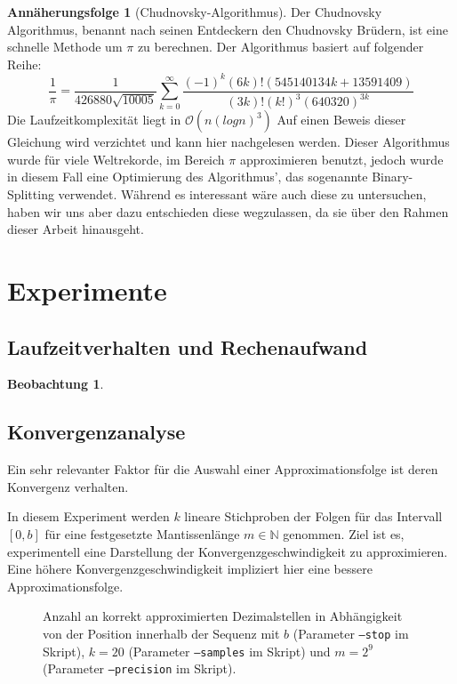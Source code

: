 \documentclass{scrartcl}
\theoremstyle{definition}
\newtheorem{approximation sequence}{Annäherungsfolge}
\newtheorem{observation}{Beobachtung}
\begin{document}
\begin{approximation sequence}[Chudnovsky-Algorithmus]
Der Chudnovsky Algorithmus, benannt nach seinen Entdeckern den Chudnovsky Brüdern, ist eine schnelle Methode um \(\pi\) zu berechnen. 
Der Algorithmus basiert auf folgender Reihe\cite{Chudnovsky}:
\[\frac{1}{\pi} = \frac{1}{426880\sqrt{10005}}\sum_{k = 0}^{\infty}\frac{(-1)^k(6k)!(545140134k+13591409)}{(3k)!(k!)^3(640320)^{3k}}\]
Die Laufzeitkomplexität liegt in \(\mathcal{O}(n(logn)^3)\) \cite{Runtime-Chudnovsky} 
Auf einen Beweis dieser Gleichung wird verzichtet und kann hier \cite{Chudnovsky-Proof} nachgelesen werden.
Dieser Algorithmus wurde für viele Weltrekorde, im Bereich \(\pi\) approximieren benutzt, jedoch wurde in diesem Fall eine Optimierung 
des Algorithmus', das sogenannte Binary-Splitting verwendet. Während es interessant wäre auch diese zu untersuchen, haben wir uns aber dazu
entschieden diese wegzulassen, da sie über den Rahmen dieser Arbeit hinausgeht. \cite{Chudnovsky}  

\end{approximation sequence}

\section{Experimente}

\subsection{Laufzeitverhalten und Rechenaufwand}

\begin{observation}

\end{observation}

\subsection{Konvergenzanalyse}

Ein sehr relevanter Faktor für die Auswahl einer Approximationsfolge ist deren
Konvergenz verhalten.

In diesem Experiment werden \(k\) lineare Stichproben der Folgen für das
Intervall \([0, b]\) für eine festgesetzte Mantissenlänge \(m \in \mathbb{N}\)
genommen. Ziel ist es, experimentell eine Darstellung der
Konvergenzgeschwindigkeit zu approximieren. Eine höhere
Konvergenzgeschwindigkeit impliziert hier eine bessere Approximationsfolge.

\begin{figure}[H]
    \centering
    \subfloat[\centering \(b = 10^2\)]{{ }}
    \subfloat[\centering \(b = 10^6\)]{{ }}
    \caption{%
        Anzahl an korrekt approximierten Dezimalstellen in Abhängigkeit von der
        Position innerhalb der Sequenz mit \(b\) (Parameter \texttt{--stop} im
        Skript), \(k = 20\) (Parameter \texttt{--samples} im Skript) und \(m =
        2^9\) (Parameter \texttt{--precision} im Skript). }
        \label{fig:convergence-analysis}
\end{figure}
\end{document}
